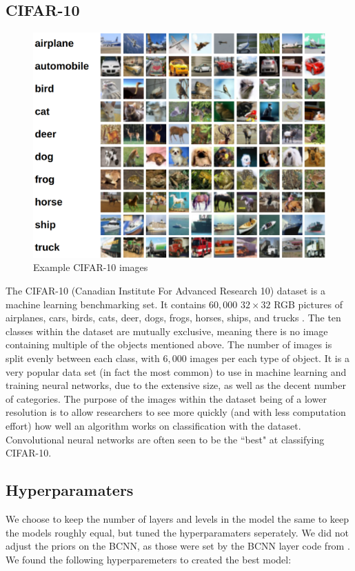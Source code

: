 \documentclass[12pt]{article}
\begin{document}
\subsection{CIFAR-10}

	\begin{figure}[H]
		\centering
	\includegraphics[width=.75\textwidth]{../Images/cifar-10.png}
	\caption{Example CIFAR-10 images \cite{cifar10}}
\end{figure}

The CIFAR-10 (Canadian Institute For Advanced Research 10) dataset is a machine learning benchmarking set. It contains $60,000$ $32 \times 32$ RGB pictures of airplanes, cars, birds, cats, deer, dogs, frogs, horses, ships, and trucks \cite{cifar10}. The ten classes within the dataset are mutually exclusive, meaning there is no image containing multiple of the objects mentioned above. The number of images is split evenly between each class, with $6,000$ images per each type of object. It is a very popular data set (in fact the most common) to use in machine learning and training neural networks, due to the extensive size, as well as the decent number of categories. The purpose of the images within the dataset being of a lower resolution is to allow researchers to see more quickly (and with less computation effort) how well an algorithm works on classification with the dataset. Convolutional neural networks are often seen to be the ``best" at classifying CIFAR-10.

\subsection{Hyperparamaters}

We choose to keep the number of layers and levels in the model the same to keep the models roughly equal, but tuned the hyperparamaters seperately. We did not adjust the priors on the BCNN, as those were set by the BCNN layer code from \cite{shridhar2018uncertainty}. We found the following hyperparemeters to created the best model:
\end{document}
